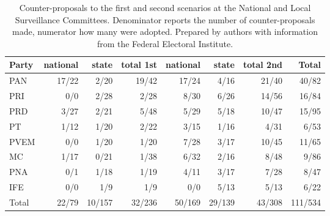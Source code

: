 \documentclass[letter,12pt]{article}
\begin{document}
\begin{table}
\begin{center}
  \begin{tabular}{lrrr|rrr|r}
    Party & national & state  & total 1st & national   & state  & total 2nd & Total \\ \hline
    PAN	  & 17/22    & 2/20   & 19/42     & 17/24      & 4/16   & 21/40  & 40/82 \\
    PRI	  & 0/0      & 2/28   & 2/28      & 8/30   & 6/26   & 14/56  & 16/84 \\
    PRD	  & 3/27     & 2/21   & 5/48      & 5/29   & 5/18   & 10/47  & 15/95 \\
    PT	  & 1/12     & 1/20   & 2/22      & 3/15   & 1/16   & 4/31   & 6/53 \\
    PVEM  & 0/0      & 1/20   & 1/20      & 7/28   & 3/17   & 10/45  & 11/65 \\
    MC    & 1/17     & 0/21   & 1/38      & 6/32   & 2/16   & 8/48   & 9/86 \\
    PNA   & 0/1      & 1/18   & 1/19      & 4/11   & 3/17   & 7/28   & 8/47 \\
    IFE   & 0/0      & 1/9    & 1/9       & 0/0    & 5/13   & 5/13   & 6/22 \\ \hline
    Total & 22/79    & 10/157 & 32/236    & 50/169 & 29/139 & 43/308 & 111/534 \\
  \end{tabular}
  \caption{Counter-proposals to the first and second scenarios at the National and Local Surveillance Committees. Denominator reports the number of counter-proposals made, numerator how many were adopted. Prepared by authors with information from the Federal Electoral Institute.}\label{T:counterprops}
\end{center}
\end{table}


\end{document}
